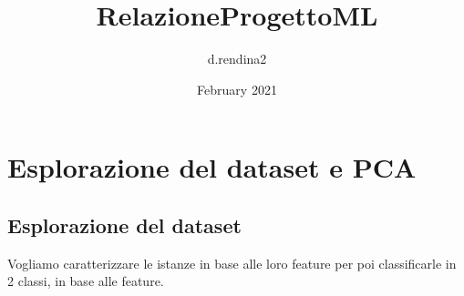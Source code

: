 \documentclass{article}
\title{RelazioneProgettoML}
\author{d.rendina2 }
\date{February 2021}
\begin{document}
\maketitle

\section{Esplorazione del dataset e PCA}
    
    \subsection{Esplorazione del dataset}
         
         
    
    Vogliamo caratterizzare le istanze in base alle loro feature per poi classificarle in 2 classi, in base alle feature.
    \\
         
\end{document}
